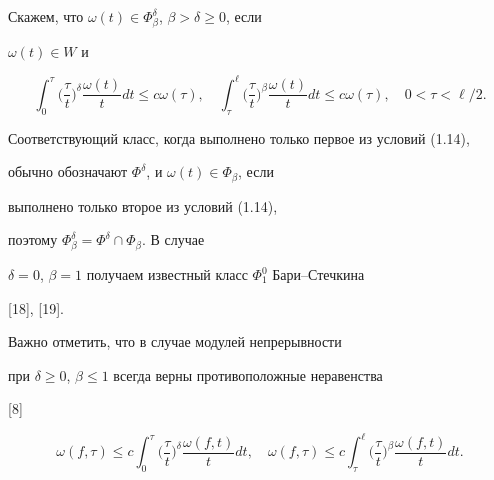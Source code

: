 \begin{defns}


Скажем, что $\omega(t) \in\Phi_\beta^\delta$, $\beta > \delta\ge 0$, если


$\omega(t) \in W$ и


\begin{equation}


\int _0^\tau \bigg( \frac{\tau}{t} \bigg)^\delta


\frac{\omega(t)}{t} dt \leq c \omega(\tau),\quad


\int _\tau^\ell \bigg( \frac{\tau}{t} \bigg)^\beta


\frac{\omega(t)}{t} dt \leq c \omega(\tau),\quad 0<\tau<\ell/2.


\end{equation}


Соответствующий класс, когда выполнено только первое из условий (1.14),


обычно обозначают $\Phi^\delta$, и $\omega(t) \in \Phi_\beta$, если


выполнено только второе из условий (1.14),


поэтому $\Phi_\beta^\delta = \Phi^\delta \cap \Phi_\beta$. В случае


$\delta=0$, $\beta=1$ получаем известный класс $\Phi_1^0$ Бари--Стечкина


[18], [19].


\end{defns}





\begin{notes}


Важно отметить, что в случае модулей непрерывности


при $\delta\ge 0$, $\beta \le 1$ всегда верны противоположные неравенства


[8]


\begin{equation}


\omega(f,\tau)\le c \int _0^\tau \bigg( \frac{\tau}{t}


\bigg)^\delta \frac{\omega(f,t)}{t} dt ,\quad


\omega(f,\tau)\le c\int _\tau^\ell \bigg( \frac{\tau}{t}


\bigg)^\beta \frac{\omega(f,t)}{t} dt .


\end{equation}


\end{notes}





